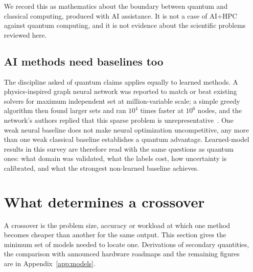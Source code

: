 \documentclass[10pt,a4paper]{article}
\begin{document}
We record this as mathematics about the boundary between quantum and classical computing, produced with AI assistance. It is not a case of AI+HPC against quantum computing, and it is not evidence about the scientific problems reviewed here.

\subsection{AI methods need baselines too}
The discipline asked of quantum claims applies equally to learned methods. A physics-inspired graph neural network was reported to match or beat existing solvers for maximum independent set at million-variable scale; a simple greedy algorithm then found larger sets and ran $10^4$ times faster at $10^6$ nodes, and the network's authors replied that this sparse problem is unrepresentative~\cite{angelini2022,schuetz2023}. One weak neural baseline does not make neural optimization uncompetitive, any more than one weak classical baseline establishes a quantum advantage. Learned-model results in this survey are therefore read with the same questions as quantum ones: what domain was validated, what the labels cost, how uncertainty is calibrated, and what the strongest non-learned baseline achieves.
\section{What determines a crossover}
\label{sec:cross}

A crossover is the problem size, accuracy or workload at which one method becomes cheaper than another for the same output. This section gives the minimum set of models needed to locate one. Derivations of secondary quantities, the comparison with announced hardware roadmaps and the remaining figures are in Appendix~\ref{app:models}.
\end{document}
